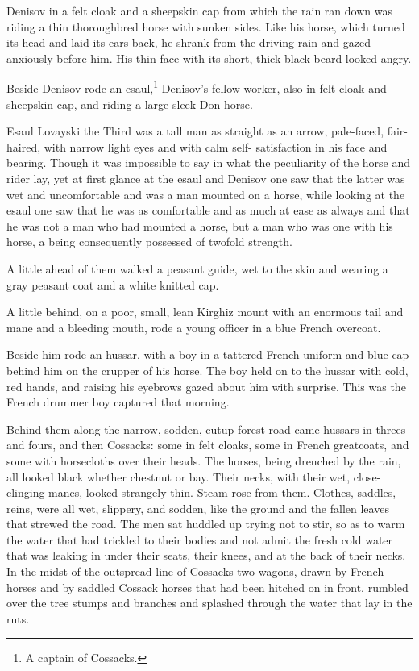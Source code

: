 Denisov in a felt cloak and a sheepskin cap from which the rain
ran down was riding a thin thoroughbred horse with sunken
sides. Like his horse, which turned its head and laid its ears
back, he shrank from the driving rain and gazed anxiously before
him. His thin face with its short, thick black beard looked
angry.

Beside Denisov rode an esaul,\footnote{A captain of Cossacks.}
Denisov's fellow worker, also in felt cloak and sheepskin cap,
and riding a large sleek Don horse.

Esaul Lovayski the Third was a tall man as straight as an arrow,
pale-faced, fair-haired, with narrow light eyes and with calm
self- satisfaction in his face and bearing. Though it was
impossible to say in what the peculiarity of the horse and rider
lay, yet at first glance at the esaul and Denisov one saw that
the latter was wet and uncomfortable and was a man mounted on a
horse, while looking at the esaul one saw that he was as
comfortable and as much at ease as always and that he was not a
man who had mounted a horse, but a man who was one with his
horse, a being consequently possessed of twofold strength.

A little ahead of them walked a peasant guide, wet to the skin
and wearing a gray peasant coat and a white knitted cap.

A little behind, on a poor, small, lean Kirghiz mount with an
enormous tail and mane and a bleeding mouth, rode a young officer
in a blue French overcoat.

Beside him rode an hussar, with a boy in a tattered French
uniform and blue cap behind him on the crupper of his horse. The
boy held on to the hussar with cold, red hands, and raising his
eyebrows gazed about him with surprise. This was the French
drummer boy captured that morning.

Behind them along the narrow, sodden, cutup forest road came
hussars in threes and fours, and then Cossacks: some in felt
cloaks, some in French greatcoats, and some with horsecloths over
their heads. The horses, being drenched by the rain, all looked
black whether chestnut or bay.  Their necks, with their wet,
close-clinging manes, looked strangely thin. Steam rose from
them. Clothes, saddles, reins, were all wet, slippery, and
sodden, like the ground and the fallen leaves that strewed the
road. The men sat huddled up trying not to stir, so as to warm
the water that had trickled to their bodies and not admit the
fresh cold water that was leaking in under their seats, their
knees, and at the back of their necks. In the midst of the
outspread line of Cossacks two wagons, drawn by French horses and
by saddled Cossack horses that had been hitched on in front,
rumbled over the tree stumps and branches and splashed through
the water that lay in the ruts.

